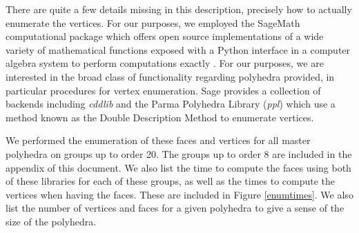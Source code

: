 \documentclass{article}
\begin{document}
	There are quite a few details missing in this description, precisely how to actually enumerate the vertices. For our purposes, we employed the SageMath computational package which offers open source implementations of a wide variety of mathematical functions exposed with a Python interface in a computer algebra system to perform computations exactly \cite{sagemath}. 
	For our purposes, we are interested in the broad class of functionality regarding polyhedra provided, in particular procedures for vertex enumeration. 
	Sage provides a collection of backends including \textit{cddlib} and the Parma Polyhedra Library (\textit{ppl}) \cite{bagnara2008parma} which use a method known as the Double Description Method to enumerate vertices.
	
	We performed the enumeration of these faces and vertices for all master polyhedra on groups up to order 20. The groups up to order 8 are included in the appendix of this document. We also list the time to compute the faces using both of these libraries for each of these groups, as well as the times to compute the vertices when having the faces. These are included in Figure \ref{enumtimes}. We also list the number of vertices and faces for a given polyhedra to give a sense of the size of the polyhedra.
	
\end{document}
